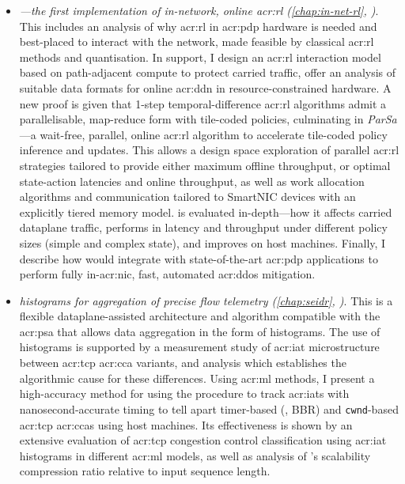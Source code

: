 \begin{itemize}
	\item \emph{\approachshort---the first implementation of in-network, online \gls{acr:rl} (\cref{chap:in-net-rl}, )}.
	This includes an analysis of why \gls{acr:rl} in \gls{acr:pdp} hardware is needed and best-placed to interact with the network, made feasible by classical \gls{acr:rl} methods and quantisation.
	In support, I design an \gls{acr:rl} interaction model based on path-adjacent compute to protect carried traffic, offer an analysis of suitable data formats for online \gls{acr:ddn} in resource-constrained hardware.
	A new proof is given that 1-step temporal-difference \gls{acr:rl} algorithms admit a parallelisable, map-reduce form with tile-coded policies, culminating in \emph{ParSa}---a wait-free, parallel, online \gls{acr:rl} algorithm to accelerate tile-coded policy inference and updates.
	This allows a design space exploration of parallel \gls{acr:rl} strategies tailored to provide either maximum offline throughput, or optimal state-action latencies and online throughput, as well as work allocation algorithms and communication tailored to SmartNIC devices with an explicitly tiered memory model.
	\approachshort{} is evaluated in-depth---how it affects carried dataplane traffic, performs in latency and throughput under different policy sizes (simple and complex state), and improves on host machines.
	Finally, I describe how \approachshort{} would integrate with state-of-the-art \gls{acr:pdp} applications to perform fully in-\gls{acr:nic}, fast, automated \gls{acr:ddos} mitigation.
		
	\item \emph{\seidr{} histograms for aggregation of precise flow telemetry (\cref{chap:seidr}, )}.
	This is a flexible dataplane-assisted architecture and algorithm compatible with the \gls{acr:psa} that allows data aggregation in the form of histograms.
	The use of histograms is supported by a measurement study of \gls{acr:iat} microstructure between \gls{acr:tcp} \gls{acr:cca} variants, and analysis which establishes the algorithmic cause for these differences.
	Using \gls{acr:ml} methods, I present a high-accuracy method for using the \seidr{} procedure to track \glspl{acr:iat} with nanosecond-accurate timing to tell apart timer-based (\eg, BBR) and \texttt{cwnd}-based \gls{acr:tcp} \glspl{acr:cca} using host machines.
	Its effectiveness is shown by an extensive evaluation of \gls{acr:tcp} congestion control classification using \gls{acr:iat} histograms in different \gls{acr:ml} models, as well as analysis of \seidr's scalability compression ratio relative to input sequence length.
	
\end{itemize}

